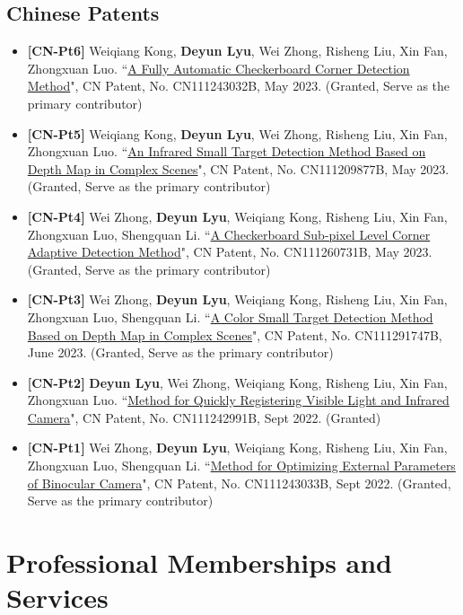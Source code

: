 \documentclass[11pt,a4paper]{moderncv}        %
\begin{document}
\subsection{Chinese Patents}

\begin{itemize}
    \item \textbf{[CN-Pt6]} Weiqiang Kong, \textbf{Deyun Lyu}, Wei Zhong, Risheng Liu, Xin Fan, Zhongxuan Luo. ``\href{https://patents.google.com/patent/CN111243032B/en}{A Fully Automatic Checkerboard Corner Detection Method}", CN Patent, No. CN111243032B, May 2023. (Granted, Serve as the primary contributor)
    \item \textbf{[CN-Pt5]} Weiqiang Kong, \textbf{Deyun Lyu}, Wei Zhong, Risheng Liu, Xin Fan, Zhongxuan Luo. ``\href{https://patents.google.com/patent/CN111209877B/en}{An Infrared Small Target Detection Method Based on Depth Map in Complex Scenes}", CN Patent, No. CN111209877B, May 2023. (Granted, Serve as the primary contributor)
    \item \textbf{[CN-Pt4]} Wei Zhong, \textbf{Deyun Lyu}, Weiqiang Kong, Risheng Liu, Xin Fan, Zhongxuan Luo, Shengquan Li. ``\href{https://patents.google.com/patent/CN111260731B/en}{A Checkerboard Sub-pixel Level Corner Adaptive Detection Method}", CN Patent, No. CN111260731B, May 2023. (Granted, Serve as the primary contributor)
    \item \textbf{[CN-Pt3]} Wei Zhong, \textbf{Deyun Lyu}, Weiqiang Kong, Risheng Liu, Xin Fan, Zhongxuan Luo, Shengquan Li. ``\href{https://patents.google.com/patent/CN111291747B/en}{A Color Small Target Detection Method Based on Depth Map in Complex Scenes}", CN Patent, No. CN111291747B, June 2023. (Granted, Serve as the primary contributor)
    \item \textbf{[CN-Pt2]} \textbf{Deyun Lyu}, Wei Zhong, Weiqiang Kong, Risheng Liu, Xin Fan, Zhongxuan Luo. ``\href{https://patents.google.com/patent/CN111242991B/en}{Method for Quickly Registering Visible Light and Infrared Camera}", CN Patent, No. CN111242991B, Sept 2022. (Granted)
    \item \textbf{[CN-Pt1]} Wei Zhong, \textbf{Deyun Lyu}, Weiqiang Kong, Risheng Liu, Xin Fan, Zhongxuan Luo, Shengquan Li. ``\href{https://patents.google.com/patent/CN111243033B/en}{Method for Optimizing External Parameters of Binocular Camera}", CN Patent, No. CN111243033B, Sept 2022. (Granted, Serve as the primary contributor)
\end{itemize}


\section{Professional Memberships and Services}
\end{document}
